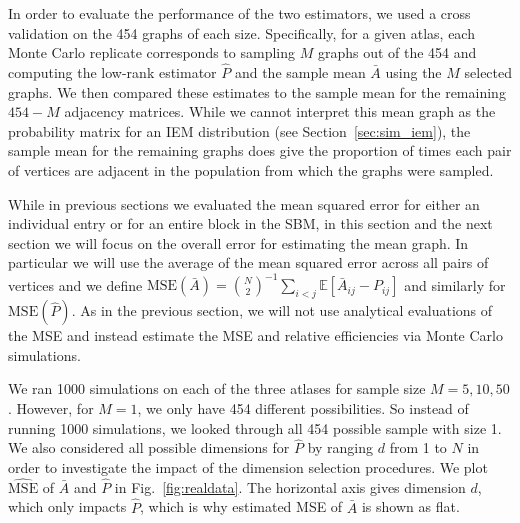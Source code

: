 \documentclass[10pt,letterpaper]{article}
\newcommand{\Ex}{\mathbb{E}}
\renewcommand{\hat}{\widehat}
\begin{document}
In order to evaluate the performance of the two estimators, we used a cross validation on the 454 graphs of each size. 
Specifically, for a given atlas, each Monte Carlo replicate corresponds to sampling $M$ graphs out of the 454 and computing the low-rank estimator $\hat{P}$ and the sample mean $\bar{A}$ using the $M$ selected graphs.
We then compared these estimates to the sample mean for the remaining $454-M$ adjacency matrices.
While we cannot interpret this mean graph as the probability matrix for an IEM distribution (see Section~\ref{sec:sim_iem}), the sample mean for the remaining graphs does give the proportion of times each pair of vertices are adjacent in the population from which the graphs were sampled.

While in previous sections we evaluated the mean squared error for either an individual entry or for an entire block in the SBM, in this section and the next section we will focus on the overall error for estimating the mean graph.
In particular we will use the average of the mean squared error across all pairs of vertices and we define $\mathrm{MSE}(\bar{A}) = \binom{N}{2}^{-1} \sum_{i<j}\Ex[\bar{A}_{ij}-P_{ij}]$ and similarly for $\mathrm{MSE}(\hat{P})$.
As in the previous section, we will not use analytical evaluations of the MSE and instead estimate the MSE and relative efficiencies via Monte Carlo simulations.

We ran 1000 simulations on each of the three atlases for sample size $M=5,10, 50$. However, for $M=1$, we only have 454 different possibilities. So instead of running 1000 simulations, we looked through all 454 possible sample with size 1.
We also considered all possible dimensions for $\hat{P}$ by ranging $d$ from 1 to $N$ in order to investigate the impact of the dimension selection procedures.
We plot $\hat{\mathrm{MSE}}$ of $\bar{A}$ and $\hat{P}$ in Fig.~\ref{fig:realdata}.
The horizontal axis gives dimension $d$, which only impacts $\hat{P}$, which is why estimated MSE of $\bar{A}$ is shown as flat.
\end{document}
